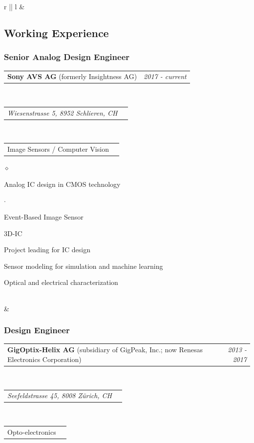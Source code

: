 \documentclass[a4paper]{article}
\makeatletter
\newlength{\sectsep}
\newlength{\subsectsep}
\newcommand{\headerrow}[2]
{\begin{tabular*}{\textwidth}{l@{\extracolsep{\fill}}r}
	#1 &
	#2 \\
\end{tabular*}}
\renewenvironment{itemize}{
  \begin{list}{$\diamond$}{
    \setlength{\topsep}{0.25em}
    \setlength{\itemsep}{0em}
    \setlength{\parskip}{0pt}
    \setlength{\parsep}{0em}
  }
}{
  \end{list}
}
\newenvironment{itemize2}{
  \begin{list}{$\cdot$}{
    \setlength{\topsep}{0.25em}
    \setlength{\itemsep}{0em}
    \setlength{\parskip}{0pt}
    \setlength{\parsep}{0em}
  }
}{
  \end{list}
}
\makeatother
\begin{document}
\begin{longtable}{r || l}
  & \begin{minipage}{0.9\textwidth}
      \vspace{\sectsep}
      \subsection*{Working Experience}
      \subsubsection*{Senior Analog Design Engineer}
      \headerrow
  		{\textbf{Sony AVS AG} (formerly Insightness AG)}{\emph{2017 - current}}
      \\
      \headerrow
        {\emph{Wiesenstrasse 5, 8952 Schlieren, CH}}{}
      \\
      \headerrow
        {Image Sensors / Computer Vision}{}

      \begin{itemize}
          \item Analog IC design in CMOS technology
          \begin{itemize2}
              \item Event-Based Image Sensor
              \item 3D-IC
          \end{itemize2}
          \item Project leading for IC design
          \item Sensor modeling for simulation and machine learning
          \item Optical and electrical characterization
      \end{itemize}
  \end{minipage} \\[\sectsep]

  & \begin{minipage}{0.9\textwidth}
      \vspace{\subsectsep}
      \subsubsection*{Design Engineer}
      \headerrow
  		{\textbf{GigOptix-Helix AG} (subsidiary of GigPeak, Inc.; now Renesas Electronics Corporation)}{\emph{2013 - 2017}}
      \\
      \headerrow
        {\emph{Seefeldstrasse 45, 8008 Zürich, CH}}{}
      \\
      \headerrow
        {Opto-electronics}{}


\end{minipage}
\end{longtable}
\end{document}

